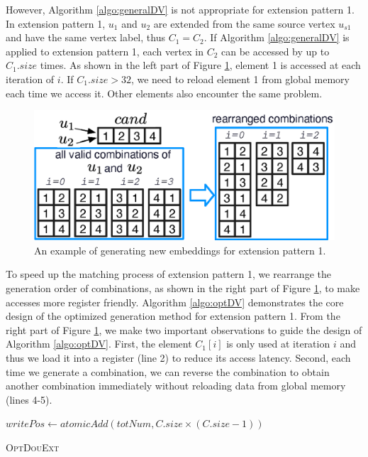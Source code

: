 However, Algorithm \ref{algo:generalDV} is not appropriate for extension pattern 1. In extension pattern 1, $u_1$ and $u_2$ are extended from the same source vertex $u_{s1}$ and have the same vertex label, thus $C_1 = C_2$. If Algorithm \ref{algo:generalDV} is applied to extension pattern 1, each vertex in $C_2$ can be accessed by up to $C_1.size$ times. As shown in the left part of Figure \ref{fig:ep1opt}, element 1 is accessed at each iteration of $i$. If $C_1.size>32$, we need to reload element 1 from global memory each time we access it. Other elements also encounter the same problem.

\begin{figure}
\centering
\includegraphics[width=\columnwidth]{./figure/ep1opt.eps}
\caption{An example of generating new embeddings for extension pattern 1.}	
\label{fig:ep1opt}
\end{figure}

To speed up the matching process of extension pattern 1, we rearrange the generation order of combinations, as shown in the right part of Figure \ref{fig:ep1opt}, to make accesses more register friendly. Algorithm \ref{algo:optDV} demonstrates the core design of the optimized generation method for extension pattern 1. From the right part of Figure \ref{fig:ep1opt}, we make two important observations to guide the design of Algorithm \ref{algo:optDV}. First, the element $C_1[i]$ is only used at iteration $i$ and thus we load it into a register (line 2) to reduce its access latency. Second, each time we generate a combination, we can reverse the combination to obtain another combination immediately without reloading data from global memory (lines 4-5).

\begin{algorithm}
	$writePos \leftarrow atomicAdd(totNum,C.size \times (C.size-1))$\;
	\caption{\textsc{OptDouExt}}
	\label{algo:optDV}
\end{algorithm}

